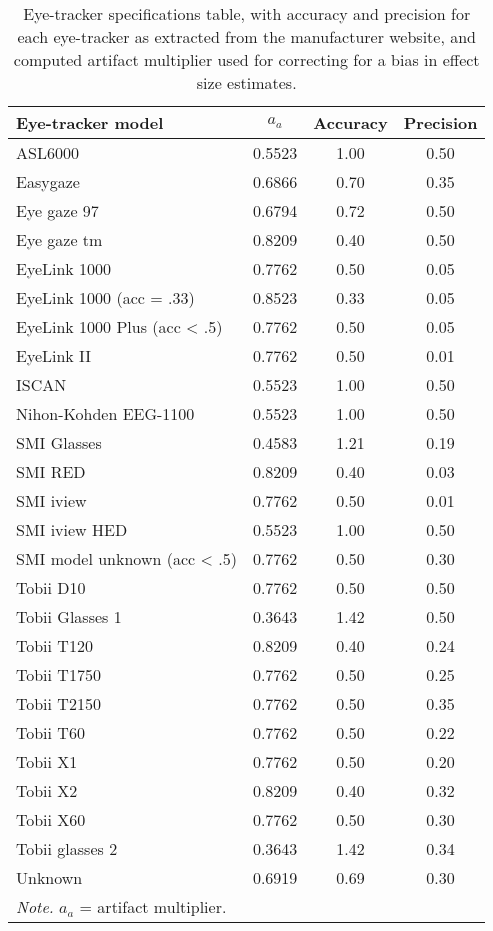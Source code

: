 \begin{table}[ht]
\centering
\caption{Eye-tracker specifications table, with accuracy and precision for each eye-tracker as extracted from the manufacturer website, and computed artifact multiplier used for correcting for a bias in effect size estimates.} 
\label{tab:eyetracker_specifications}
\begin{tabular}{lccc}
  \hline
Eye-tracker model & $a_a$ & Accuracy & Precision \\ 
  \hline
ASL6000 & 0.5523 & 1.00 & 0.50 \\ 
  Easygaze & 0.6866 & 0.70 & 0.35 \\ 
  Eye gaze 97 & 0.6794 & 0.72 & 0.50 \\ 
  Eye gaze tm & 0.8209 & 0.40 & 0.50 \\ 
  EyeLink 1000 & 0.7762 & 0.50 & 0.05 \\ 
  EyeLink 1000 (acc = .33) & 0.8523 & 0.33 & 0.05 \\ 
  EyeLink 1000 Plus (acc < .5) & 0.7762 & 0.50 & 0.05 \\ 
  EyeLink II & 0.7762 & 0.50 & 0.01 \\ 
  ISCAN & 0.5523 & 1.00 & 0.50 \\ 
  Nihon-Kohden EEG-1100 & 0.5523 & 1.00 & 0.50 \\ 
  SMI Glasses & 0.4583 & 1.21 & 0.19 \\ 
  SMI RED & 0.8209 & 0.40 & 0.03 \\ 
  SMI iview & 0.7762 & 0.50 & 0.01 \\ 
  SMI iview HED & 0.5523 & 1.00 & 0.50 \\ 
  SMI model unknown (acc < .5) & 0.7762 & 0.50 & 0.30 \\ 
  Tobii D10 & 0.7762 & 0.50 & 0.50 \\ 
  Tobii Glasses 1 & 0.3643 & 1.42 & 0.50 \\ 
  Tobii T120 & 0.8209 & 0.40 & 0.24 \\ 
  Tobii T1750 & 0.7762 & 0.50 & 0.25 \\ 
  Tobii T2150 & 0.7762 & 0.50 & 0.35 \\ 
  Tobii T60 & 0.7762 & 0.50 & 0.22 \\ 
  Tobii X1 & 0.7762 & 0.50 & 0.20 \\ 
  Tobii X2 & 0.8209 & 0.40 & 0.32 \\ 
  Tobii X60 & 0.7762 & 0.50 & 0.30 \\ 
  Tobii glasses 2 & 0.3643 & 1.42 & 0.34 \\ 
  Unknown & 0.6919 & 0.69 & 0.30 \\ 
   \hline 
 \multicolumn{4}{l}{\scriptsize{\textit{Note.} $a_a$ = artifact multiplier.}} 
\end{tabular}
\end{table}
